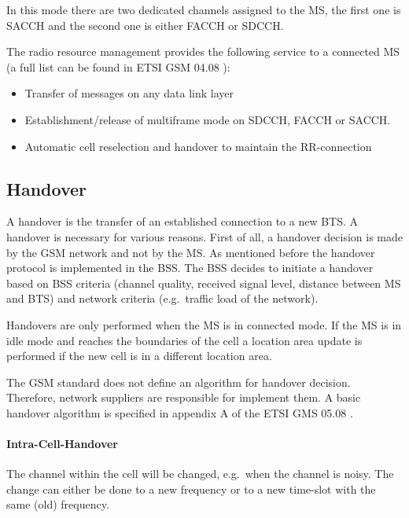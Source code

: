 \documentclass[master,english]{hgbthesis}
\begin{document}
In this mode there are two dedicated channels assigned to the MS, the first one is SACCH and the second one is either FACCH or SDCCH. 

The radio resource management provides the following service to a connected MS (a full list can be found in ETSI GSM 04.08 \cite{Etsi1994}):

\begin{itemize}

	\item Transfer of messages on any data link layer

	\item Establishment/release of multiframe mode on SDCCH, FACCH or SACCH.

	\item Automatic cell reselection and handover to maintain the RR-connection

\end{itemize}

\subsection{Handover}

A handover is the transfer of an established connection to a new BTS. A handover is necessary for various reasons. First of all, a handover decision is made by the GSM network and not by the MS. As mentioned before the handover protocol is implemented in the BSS. The BSS decides to initiate a handover based on BSS criteria (channel quality, received signal level, distance between MS and BTS) and network criteria (e.g.\ traffic load of the network).

Handovers are only performed when the MS is in connected mode. If the MS is in idle mode and reaches the boundaries of the cell a location area update is performed if the new cell is in a different location area.

The GSM standard does not define an algorithm for handover decision. Therefore, network suppliers are responsible for implement them. A basic handover algorithm is specified in appendix A of the ETSI GMS 05.08 \cite{Etsi19942}.

\paragraph{Intra-Cell-Handover} The channel within the cell will be changed, e.g.\ when the channel is noisy. The change can either be done to a new frequency or to a new time-slot with the same (old) frequency.
\end{document}
